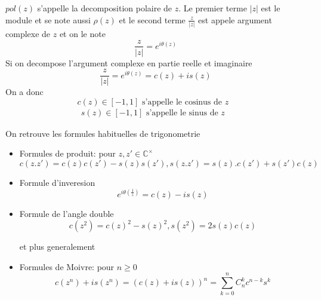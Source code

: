 \documentclass[../main.tex]{subfiles}
\begin{document}
\begin{defn}
	$pol( z) $ s'appelle la decomposition polaire de $z$. Le premier terme $|z|$ est le module et se note aussi $\rho( z) $ et le second terme $\frac{z}{|z|}$ est appele argument complexe de $z$ et on le note
	\[ 
		\frac{z}{|z|}= e^{i \theta( z) } 
	\]
	Si on decompose l'argument complexe en partie reelle et imaginaire
	\[ 
		\frac{z}{|z|}= e^{i\theta( z) } = c( z) + i s( z) 
	\]
	On a donc
	\[ 
		c( z) \in [ -1,1] \text{ s'appelle le cosinus de $z$ } 
	\]
	\begin{align*}
	s( z) \in [ -1,1] \text{ s'appelle le sinus de $z$ } 
	\end{align*}
\end{defn}
\begin{propo}
	On retrouve les formules habituelles de trigonometrie
	\begin{itemize}
	\item Formules de produit: pour $z,z' \in \mathbb{C}^{\times}$
		\[ 
			c( z.z') = c( z)  c( z' ) - s( z) s( z') , s( z.z') = s( z) .c( z') + s( z') c( z) 
		\]

	\item Formule d'inveresion
		\[ 
			e^{i \theta( \frac{1}{z}) } = c( z) - i s( z) 
		\]
		
	\item Formule de l'angle double
		\[ 
			c( z^{2}) = c( z) ^{2}- s( z) ^{2}, s( z^{2}) = 2 s( z) c( z) 
		\]
		
		et plus generalement

	\item Formules de Moivre: pour $n\geq 0$ 
		\[ 
			c( z^{n}) + i s( z^{n}) = ( c( z) + i s( z) ) ^{n} = \sum_{k=0}^{ n}C_{n} ^{k}c^{n-k}s^{k}
		\]
		
	\end{itemize}
	

\end{propo}
\end{document}
